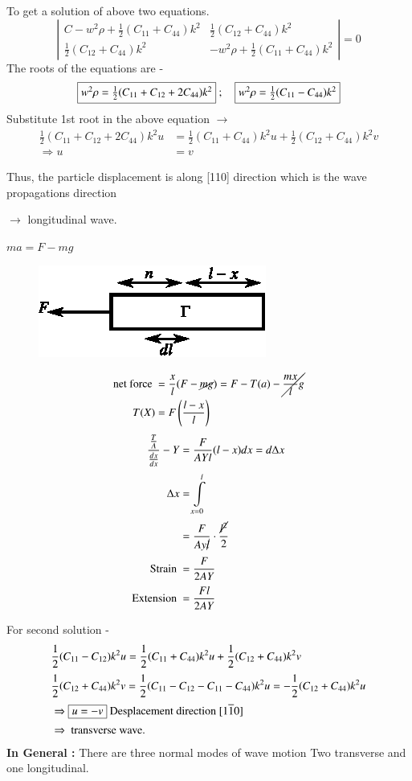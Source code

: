 \smallskip

To get a solution of above two equations.
$$
\left|
\begin{array}{lr}
C-w^{2}\rho+\frac{1}{2}(C_{11}+C_{44})k^{2} & \frac{1}{2}(C_{12}+C_{44})k^{2}\\[5pt]
\frac{1}{2}(C_{12}+C_{44})k^{2} & -w^{2}\rho+\frac{1}{2}(C_{11}+C_{44})k^{2}
\end{array}
\right|=0
$$
The roots of the equations are -
$$
\fbox{$w^{2}\rho =\frac{1}{2}(C_{11}+C_{12}+2C_{44})k^{2}$} \ ;\quad \fbox{$w^{2}\rho=\frac{1}{2}(C_{11}-C_{44})k^{2}$}
$$
Substitute 1st root in the above equation $\to$
\begin{align*}
\frac{1}{2}(C_{11}+C_{12}+2C_{44})k^{2}u &= \frac{1}{2}(C_{11}+C_{44})k^{2}u+\frac{1}{2}(C_{12}+C_{44})k^{2}v\\
\Rightarrow u &= v
\end{align*}

Thus, the particle displacement is along [110] direction which is the wave propagations direction

$\to$ longitudinal wave.

$ma=F-mg$
\begin{figure}[H]
\centering
\includegraphics[scale=1.5]{images/lecture17/fig2a.eps}
\end{figure}
\begin{align*}
\text{net force } &= \frac{x}{l}(F-\cancel{mg})=F-T(a)-\cancel{\dfrac{mx}{l}g}\\
T(X) &= F\left(\frac{l-x}{l}\right)
\end{align*}
\begin{align*}
\dfrac{\frac{T}{A}}{\frac{dx}{dx}}-Y &= \dfrac{F}{AYl}(l-x)dx=d\Delta x\\[2pt]
\Delta x &= \int\limits^{l}_{x=0}\\[2pt]
&= \frac{F}{Ay\cancel{l}}\cdot \dfrac{\cancel{l^{2}}}{2}\\[2pt]
\text{Strain } &= \dfrac{F}{2AY}\\[2pt]
\text{Extension } &= \dfrac{Fl}{2AY}
\end{align*}

\eject

For second solution -
\begin{align*}
& \frac{1}{2}(C_{11}-C_{12})k^{2}u=\frac{1}{2}(C_{11}+C_{44})k^{2}u+\frac{1}{2}(C_{12}+C_{44})k^{2}v\\[2pt]
& \frac{1}{2}(C_{12}+C_{44})k^{2}v=\frac{1}{2}(C_{11}-C_{12}-C_{11}-C_{44})k^{2}u=-\frac{1}{2}(C_{12}+C_{44})k^{2}u\\[2pt]
&\Rightarrow \fbox{$u=-v$} \text{ Desplacement direction $[1\overline{1}0]$}\\[2pt]
&\Rightarrow \text{ transverse wave.}
\end{align*}
{\bf In General :} There are three normal modes of wave motion Two transverse and one longitudinal.

